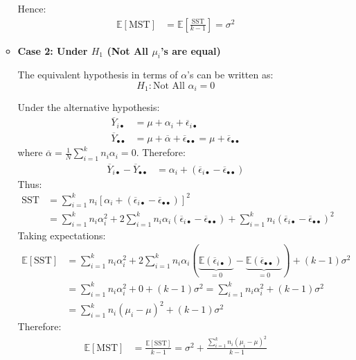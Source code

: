 \documentclass[twoside]{book}
\begin{document}
\begin{itemize}
\begin{itemize}
Hence:
\begin{align*}
\mathbb{E}[\text{MST}] &= \mathbb{E}\left[\frac{\text{SST}}{k-1}\right] = \sigma^2
\end{align*}
\item \textbf{Case 2: Under $H_1$ (Not All $\mu_i$'s are equal)}

\bigskip

The equivalent hypothesis in terms of $\alpha$'s can be written as:
$$H_1: \text{Not All } \alpha_i = 0$$

Under the alternative hypothesis:
\begin{align*}
\overline{Y}_{i\bullet} &= \mu + \alpha_i + \overline{\epsilon}_{i\bullet} \\
\overline{Y}_{\bullet\bullet} &= \mu + \overline{\alpha} + \overline{\epsilon}_{\bullet\bullet}= \mu + \overline{\epsilon}_{\bullet\bullet}
\end{align*}
where $\overline{\alpha} = \frac{1}{N}\sum_{i=1}^k n_i \alpha_i = 0$.
Therefore:
\begin{align*}
\overline{Y}_{i\bullet} - \overline{Y}_{\bullet\bullet} &= \alpha_i + (\overline{\epsilon}_{i\bullet} - \overline{\epsilon}_{\bullet\bullet})
\end{align*}
Thus:
\begin{align*}
\text{SST} &= \sum_{i=1}^k n_i[\alpha_i + (\overline{\epsilon}_{i\bullet} - \overline{\epsilon}_{\bullet\bullet})]^2 \\
&= \sum_{i=1}^k n_i\alpha_i^2 + 2\sum_{i=1}^k n_i\alpha_i(\overline{\epsilon}_{i\bullet} - \overline{\epsilon}_{\bullet\bullet}) + \sum_{i=1}^k n_i(\overline{\epsilon}_{i\bullet} - \overline{\epsilon}_{\bullet\bullet})^2
\end{align*}
Taking expectations:
\begin{align*}
\mathbb{E}[\text{SST}] &= \sum_{i=1}^k n_i\alpha_i^2 + 2\sum_{i=1}^k n_i\alpha_i\left( \underbrace{\mathbb{E}\left( \overline{\epsilon}_{i\bullet}\right)}_{=0}  - \underbrace{\mathbb{E}\left( \overline{\epsilon}_{\bullet\bullet}\right)}_{=0}\right)   + (k-1)\sigma^2 \\
&= \sum_{i=1}^k n_i\alpha_i^2 + 0 + (k-1)\sigma^2 = \sum_{i=1}^k n_i\alpha_i^2 + (k-1)\sigma^2\\
&=\sum_{i=1}^k n_i\left(\mu_i-\mu \right) ^2 + (k-1)\sigma^2
\end{align*}
Therefore:
\begin{align*}
\mathbb{E}[\text{MST}] &= \frac{\mathbb{E}[\text{SST}]}{k-1} = \sigma^2 + \frac{\sum_{i=1}^k n_i(\mu_i-\mu)^2}{k-1}
\end{align*}
\end{itemize}
\end{itemize}
\end{document}

